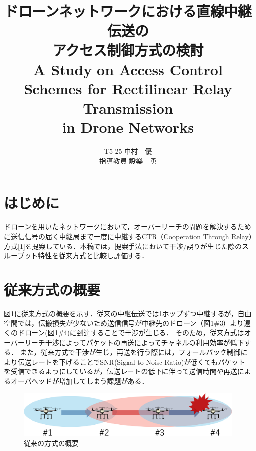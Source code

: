 \documentclass[a4paper,10pt]{ltjsarticle}
\title{\huge ドローンネットワークにおける直線中継伝送の\\アクセス制御方式の検討\\
\Large A Study on Access Control Schemes for Rectilinear Relay Transmission \\in Drone Networks
}
\author{
T5-25 \:中村　優\\
指導教員 \: 設樂　勇
}
\date{}
\begin{document}
\twocolumn[
\maketitle
]

\section{はじめに}
ドローンを用いたネットワークにおいて，オーバーリーチの問題を解決するために送信信号の届く中継局まで一度に中継するCTR（Cooperation Through Relay）方式[1]を提案している．本稿では，提案手法において干渉/誤りが生じた際のスループット特性を従来方式と比較し評価する．

\section{従来方式の概要}
図1に従来方式の概要を示す．従来の中継伝送では1ホップずつ中継するが，自由空間では，伝搬損失が少ないため送信信号が中継先のドローン（図1\#3）より遠くのドローン(図1\#4)に到達することで干渉が生じる．
そのため，従来方式はオーバーリーチ干渉によってパケットの再送によってチャネルの利用効率が低下する．
また，従来方式で干渉が生じ，再送を行う際には，フォールバック制御により伝送レートを下げることでSNR(Signal to Noise Ratio)が低くてもパケットを受信できるようにしているが，伝送レートの低下に伴って送信時間や再送によるオーバヘッドが増加してしまう課題がある．

\begin{figure}[H]
  \centering
  \includegraphics[width=\linewidth]{fig1.pdf} %
  \caption{従来の方式の概要}

\end{figure}
\end{document}
